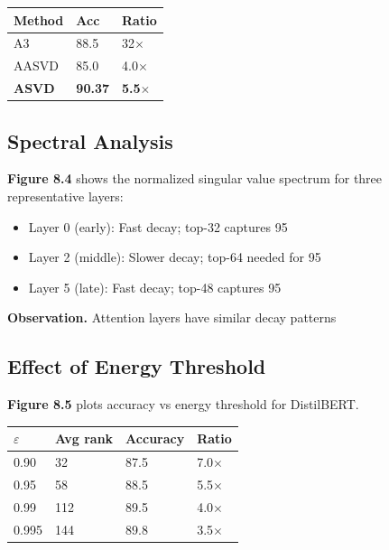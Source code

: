 \begin{table}[H]
\centering
\small
\begin{tabular}{lll}
\toprule
\textbf{Method} & \textbf{Acc} & \textbf{Ratio} \\
\midrule
A3 & 88.5 & 32$\times$ \\
AASVD & 85.0 & 4.0$\times$ \\
\textbf{ASVD} & \textbf{90.37} & \textbf{5.5$\times$} \\
\bottomrule
\end{tabular}
\end{table}

\subsection{Spectral Analysis}

\textbf{Figure 8.4} shows the normalized singular value spectrum for three 
representative layers:

\begin{itemize}
\item Layer 0 (early): Fast decay; top-32 captures 95%
\item Layer 2 (middle): Slower decay; top-64 needed for 95%
\item Layer 5 (late): Fast decay; top-48 captures 95%

\end{itemize}
\textbf{Observation.} Attention layers have similar decay patterns

\subsection{Effect of Energy Threshold}

\textbf{Figure 8.5} plots accuracy vs energy threshold for DistilBERT.

\begin{table}[H]
\centering
\small
\begin{tabular}{llll}
\toprule
\textbf{$\varepsilon$} & \textbf{Avg rank} & \textbf{Accuracy} & \textbf{Ratio} \\
\midrule
0.90 & 32 & 87.5 & 7.0$\times$ \\
0.95 & 58 & 88.5 & 5.5$\times$ \\
0.99 & 112 & 89.5 & 4.0$\times$ \\
0.995 & 144 & 89.8 & 3.5$\times$ \\
\bottomrule
\end{tabular}
\end{table}

